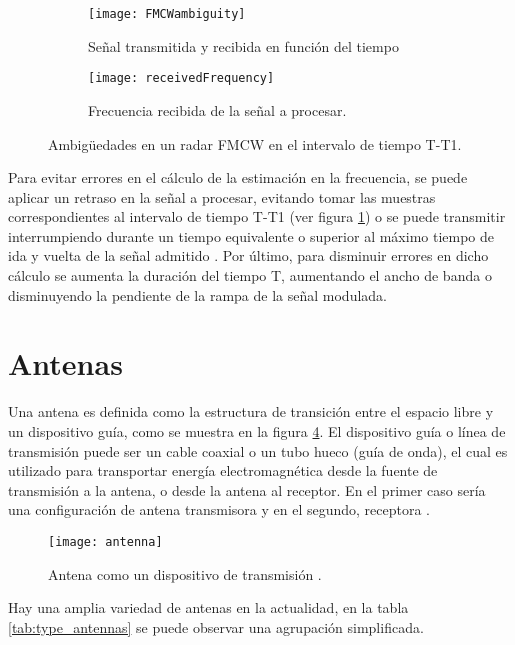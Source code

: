 \begin{figure}[H]
  \centering
  \begin{subfigure}[t]{0.49\textwidth}
    \texttt{[image: FMCWambiguity]}
    \caption{Señal transmitida y recibida en función del tiempo}
    \label{fig:fmcwAmbiguity}   
  \end{subfigure}
  \begin{subfigure}[t]{0.49\textwidth}
    \texttt{[image: receivedFrequency]}
    \caption{Frecuencia recibida de la señal a procesar.}
    \label{fig:modulationDelayed}
  \end{subfigure}             
  \caption{Ambigüedades en un radar FMCW en el intervalo de tiempo T-T1.}
\end{figure}

Para evitar errores en el cálculo de la estimación en la frecuencia, se puede aplicar un retraso en la señal a procesar, evitando tomar las muestras correspondientes al intervalo de tiempo T-T1 (ver figura \ref{fig:fmcwAmbiguity}) o se puede transmitir interrumpiendo durante un tiempo equivalente o superior al máximo tiempo de ida y vuelta de la señal admitido \cite{Varavin2007a}. Por último, para disminuir errores en dicho cálculo se aumenta la duración del tiempo T, aumentando el ancho de banda o disminuyendo la pendiente de la rampa de la señal modulada.

\section{Antenas}

Una antena es definida como la estructura de transición entre el espacio libre y un dispositivo guía, como se muestra en la 
figura \ref{fig:antenna}. El dispositivo guía o línea de transmisión puede ser un cable coaxial o un tubo hueco (guía de 
onda), el cual es utilizado para transportar energía electromagnética desde la fuente de transmisión a la antena, o desde la 
antena al receptor. En el primer caso sería una configuración de antena transmisora y en el segundo, receptora \cite{Balanis2012}.
\begin{figure}[H]
 \centering
 \texttt{[image: antenna]}
 \caption{Antena como un dispositivo de transmisión \cite{Balanis2012}.}
 \label{fig:antenna}
\end{figure}

Hay una amplia variedad de antenas en la actualidad, en la tabla \ref{tab:type_antennas} se puede observar una agrupación 
simplificada.

